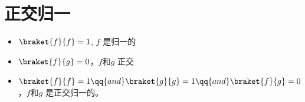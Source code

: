 
\section{正交归一}
\begin{itemize}
	\item \(\braket{f}{f}=1\), \(f\) 是归一的
	\item \(\braket{f}{g}=0\)，\(f\)和\(g\) 正交
	\item \(\braket{f}{f}=1 \qq{and} \braket{g}{g}=1 \qq{and} \braket{f}{g}=0\)，\(f\)和\(g\) 是正交归一的。
\end{itemize}






